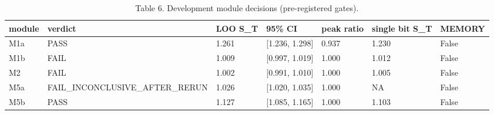 \begin{table}[t]
\centering
\small
\caption{Table 6. Development module decisions (pre-registered gates).}
\begin{tabular}{lllllll}
\hline
module & verdict & LOO S\_T & 95\% CI & peak ratio & single bit S\_T & MEMORY \\
\hline
M1a & PASS & 1.261 & [1.236, 1.298] & 0.937 & 1.230 & False \\
M1b & FAIL & 1.009 & [0.997, 1.019] & 1.000 & 1.012 & False \\
M2 & FAIL & 1.002 & [0.991, 1.010] & 1.000 & 1.005 & False \\
M5a & FAIL\_INCONCLUSIVE\_AFTER\_RERUN & 1.026 & [1.020, 1.035] & 1.000 & NA & False \\
M5b & PASS & 1.127 & [1.085, 1.165] & 1.000 & 1.103 & False \\
\hline
\end{tabular}
\end{table}
